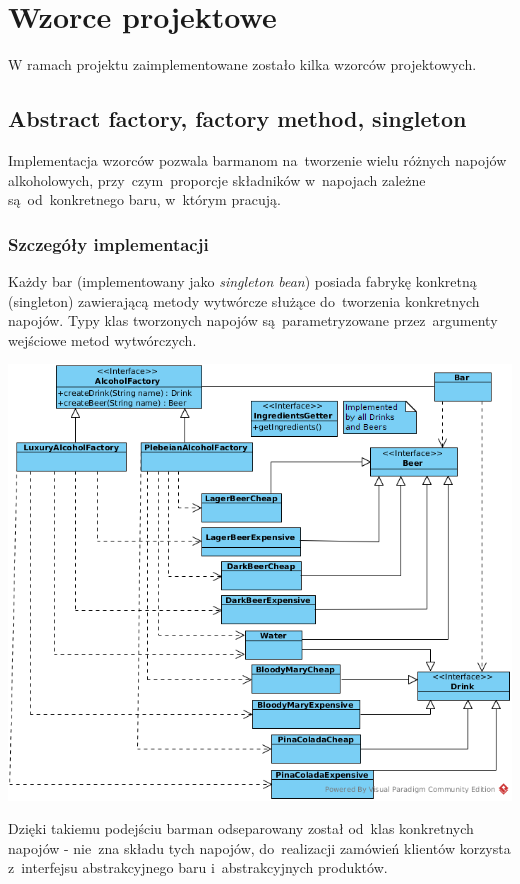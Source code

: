 \documentclass[11pt]{aghdpl}
\begin{document}
\chapter{Wzorce projektowe}
W ramach projektu zaimplementowane zostało kilka wzorców projektowych.

\section{Abstract factory, factory method, singleton}
Implementacja wzorców pozwala barmanom na~tworzenie wielu różnych napojów alkoholowych, przy~czym~proporcje składników w~napojach zależne są~od~konkretnego baru, w~którym pracują. 

\subsection{Szczegóły implementacji}
Każdy bar (implementowany jako \textit{singleton bean}) posiada fabrykę konkretną (singleton) zawierającą metody wytwórcze służące do~tworzenia konkretnych napojów. Typy klas tworzonych napojów są~parametryzowane przez~argumenty wejściowe metod wytwórczych. 

\begin{center}
 \includegraphics[width=14cm]{factory}
\end{center}

Dzięki takiemu podejściu barman odseparowany został od~klas konkretnych napojów - nie~zna składu tych napojów, do~realizacji zamówień klientów korzysta z~interfejsu abstrakcyjnego baru i~abstrakcyjnych produktów. 
\end{document}
